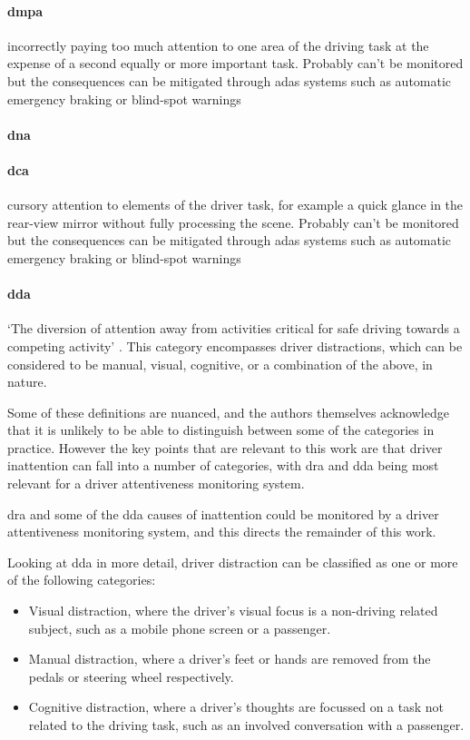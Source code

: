 \documentclass[11pt, parskip=half*,twoside=false]{scrbook}
\begin{document}
\paragraph{\gls{dmpa}} incorrectly paying too much attention to one area of the driving task at the expense of a second equally or more important task. Probably can't be monitored but the consequences can be mitigated through \gls{adas} systems such as automatic emergency braking or blind-spot warnings

\paragraph{\gls{dna}}  

\paragraph{\gls{dca}} cursory attention to elements of the driver task, for example a quick glance in the rear-view mirror without fully processing the scene. Probably can't be monitored but the consequences can be mitigated through \gls{adas} systems such as automatic emergency braking or blind-spot warnings

\paragraph{\gls{dda}} `The diversion of attention away from activities critical for safe driving towards a competing activity' \citep{reganDriverDistractionDriver2011}. This category encompasses driver distractions, which can be considered to be manual, visual, cognitive, or a combination of the above, in nature.

Some of these definitions are nuanced, and the authors themselves acknowledge that it is unlikely to be able to distinguish between some of the categories in practice. However the key points that are relevant to this work are that driver inattention can fall into a number of categories, with \gls{dra} and \gls{dda} being most relevant for a driver attentiveness monitoring system.

\gls{dra} and some of the \gls{dda} causes of inattention could be monitored by a driver attentiveness monitoring system, and this directs the remainder of this work.  

Looking at \gls{dda} in more detail, driver distraction can be classified as one or more of the following categories:
\begin{itemize}
	\item Visual distraction, where the driver's visual focus is a non-driving related subject, such as a mobile phone screen or a passenger.
	\item Manual distraction, where a driver's feet or hands are removed from the pedals or steering wheel respectively.
	\item Cognitive distraction, where a driver's thoughts are focussed on a task not related to the driving task, such as an involved conversation with a passenger.
\end{itemize}
\end{document}
